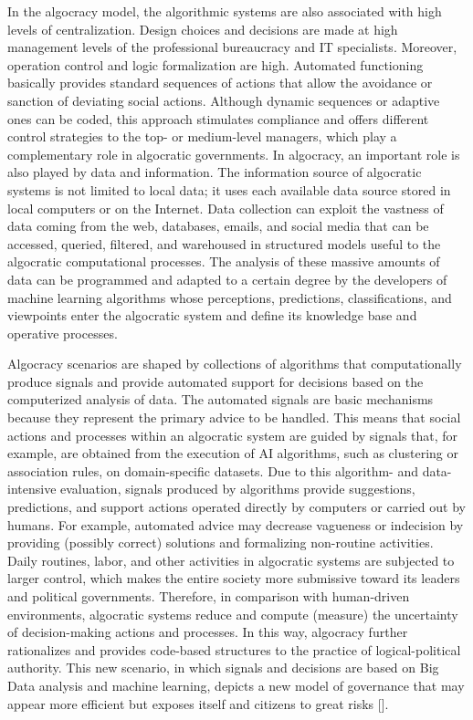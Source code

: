 In the algocracy model, the algorithmic systems are also associated with high levels of centralization. Design choices and decisions are made at high management levels of the professional bureaucracy and IT specialists. Moreover, operation control and logic formalization are high. Automated functioning basically provides standard sequences of actions that allow the avoidance or sanction of deviating social actions. Although dynamic sequences or adaptive ones can be coded, this approach stimulates compliance and offers different control strategies to the top- or medium-level managers, which play a complementary role in algocratic governments. In algocracy, an important role is also played by data and information. The information source of algocratic systems is not limited to local data; it uses each available data source stored in local computers or on the Internet. Data collection can exploit the vastness of data coming from the web, databases, emails, and social media that can be accessed, queried, filtered, and warehoused in structured models useful to the algocratic computational processes. The analysis of these massive amounts of data can be programmed and adapted to a certain degree by the developers of machine learning algorithms whose perceptions, predictions, classifications, and viewpoints enter the algocratic system and define its knowledge base and operative processes.

Algocracy scenarios are shaped by collections of algorithms that computationally produce signals and provide automated support for decisions based on the computerized analysis of data. The automated signals are basic mechanisms because they represent the primary advice to be handled. This means that social actions and processes within an algocratic system are guided by signals that, for example, are obtained from the execution of AI algorithms, such as clustering or association rules, on domain-specific datasets. Due to this algorithm- and data-intensive evaluation, signals produced by algorithms provide suggestions, predictions, and support actions operated directly by computers or carried out by humans. For example, automated advice may decrease vagueness or indecision by providing (possibly correct) solutions and formalizing non-routine activities. Daily routines, labor, and other activities  in algocratic systems are subjected to larger control, which makes the entire society more submissive toward its leaders and political governments. Therefore, in comparison with human-driven environments, algocratic systems reduce and compute (measure) the uncertainty of decision-making actions and processes. In this way, algocracy further rationalizes and provides code-based structures to the practice of logical-political authority. This new scenario, in which signals and decisions are based on Big Data analysis and machine learning, depicts a new model of governance that may appear more efficient but exposes itself and citizens to great risks [\citealt{chap:9:Danaher:2016}].

